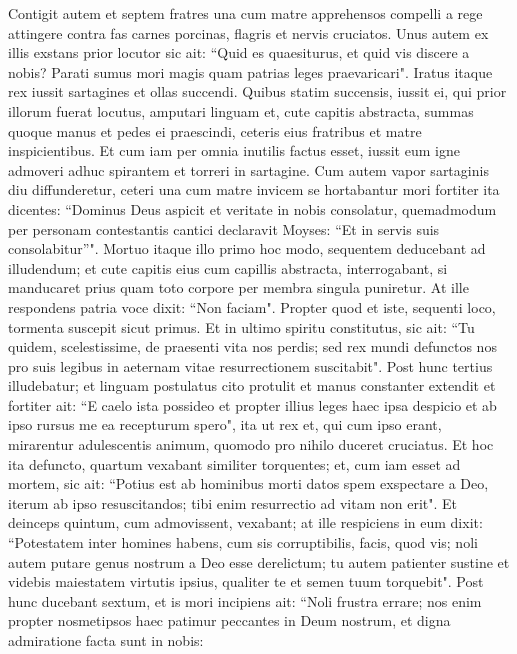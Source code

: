\begin{biblechapter}  
\verse Contigit autem et septem fratres una cum matre apprehensos compelli a rege attingere contra fas carnes porcinas, flagris et nervis cruciatos. 
\verse Unus autem ex illis exstans prior locutor sic ait: “Quid es quaesiturus, et quid vis discere a nobis? Parati sumus mori magis quam patrias leges praevaricari". 
\verse Iratus itaque rex iussit sartagines et ollas succendi. 
\verse Quibus statim succensis, iussit ei, qui prior illorum fuerat locutus, amputari linguam et, cute capitis abstracta, summas quoque manus et pedes ei praescindi, ceteris eius fratribus et matre inspicientibus. 
\verse Et cum iam per omnia inutilis factus esset, iussit eum igne admoveri adhuc spirantem et torreri in sartagine. Cum autem vapor sartaginis diu diffunderetur, ceteri una cum matre invicem se hortabantur mori fortiter ita dicentes: 
\verse “Dominus Deus aspicit et veritate in nobis consolatur, quemadmodum per personam contestantis cantici declaravit Moyses: “Et in servis suis consolabitur”". 
\verse Mortuo itaque illo primo hoc modo, sequentem deducebant ad illudendum; et cute capitis eius cum capillis abstracta, interrogabant, si manducaret prius quam toto corpore per membra singula puniretur. 
\verse At ille respondens patria voce dixit: “Non faciam". Propter quod et iste, sequenti loco, tormenta suscepit sicut primus. 
\verse Et in ultimo spiritu constitutus, sic ait: “Tu quidem, scelestissime, de praesenti vita nos perdis; sed rex mundi defunctos nos pro suis legibus in aeternam vitae resurrectionem suscitabit". 
\verse Post hunc tertius illudebatur; et linguam postulatus cito protulit et manus constanter extendit 
\verse et fortiter ait: “E caelo ista possideo et propter illius leges haec ipsa despicio et ab ipso rursus me ea recepturum spero", 
\verse ita ut rex et, qui cum ipso erant, mirarentur adulescentis animum, quomodo pro nihilo duceret cruciatus. 
\verse Et hoc ita defuncto, quartum vexabant similiter torquentes; 
\verse et, cum iam esset ad mortem, sic ait: “Potius est ab hominibus morti datos spem exspectare a Deo, iterum ab ipso resuscitandos; tibi enim resurrectio ad vitam non erit".  
\verse Et deinceps quintum, cum admovissent, vexabant; 
\verse at ille respiciens in eum dixit: “Potestatem inter homines habens, cum sis corruptibilis, facis, quod vis; noli autem putare genus nostrum a Deo esse derelictum; 
\verse tu autem patienter sustine et videbis maiestatem virtutis ipsius, qualiter te et semen tuum torquebit". 
\verse Post hunc ducebant sextum, et is mori incipiens ait: “Noli frustra errare; nos enim propter nosmetipsos haec patimur peccantes in Deum nostrum, et digna admiratione facta sunt in nobis: 

\end{biblechapter}
